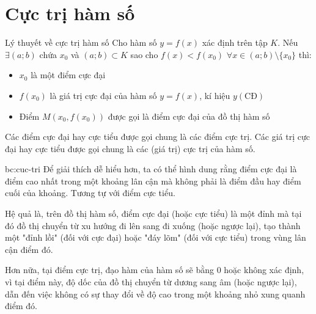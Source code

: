 \section{Cực trị hàm số}

\begin{lythuyetbox}{Lý thuyết về cực trị hàm số}
Cho hàm số $y = f(x)$ xác định trên tập $K$.
Nếu $\exists (a;b)$ chứa $x_0$ và $(a;b) \subset K$ sao cho $f(x) < f(x_0)$ $\forall x \in (a;b) \setminus \{x_0\}$ thì:
\begin{itemize}
    \item $x_0$ là một điểm cực đại
    \item $f(x_0)$ là giá trị cực đại của hàm số $y = f(x)$, kí hiệu $y(\mathrm{CĐ})$
    \item Điểm $M(x_0, f(x_0))$ được gọi là điểm cực đại của đồ thị hàm số
\end{itemize}
Các điểm cực đại hay cực tiểu được gọi chung là các điểm cực trị. Các giá trị cực đại hay cực tiểu được gọi chung là các (giá trị) cực trị của hàm số.

\vspace{1.5em} %

\begin{banchat}{}{bc:cuc-tri}
Để giải thích dễ hiểu hơn, ta có thể hình dung rằng điểm cực đại là điểm cao nhất trong một khoảng lân cận mà không phải là điểm đầu hay điểm cuối của khoảng. Tương tự với điểm cực tiểu.

\vspace{1.5em}

Hệ quả là, trên đồ thị hàm số, điểm cực đại (hoặc cực tiểu) là một đỉnh mà tại đó đồ thị chuyển từ xu hướng đi lên sang đi xuống (hoặc ngược lại), tạo thành một "đỉnh lồi" (đối với cực đại) hoặc "đáy lõm" (đối với cực tiểu) trong vùng lân cận điểm đó.

\vspace{1.5em}

Hơn nữa, tại điểm cực trị, đạo hàm của hàm số sẽ bằng 0 hoặc không xác định, vì tại điểm này, độ dốc của đồ thị chuyển từ dương sang âm (hoặc ngược lại), dẫn đến việc không có sự thay đổi về độ cao trong một khoảng nhỏ xung quanh điểm đó.


\end{banchat}
\end{lythuyetbox}

